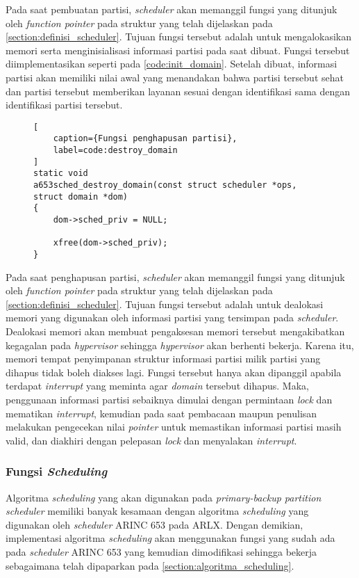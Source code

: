 Pada saat pembuatan partisi, \textit{scheduler} akan memanggil fungsi yang ditunjuk oleh
\textit{function pointer}  pada struktur yang telah dijelaskan pada
\autoref{section:definisi_scheduler}. Tujuan fungsi tersebut adalah untuk mengalokasikan memori
serta menginisialisasi informasi partisi pada saat dibuat. Fungsi tersebut diimplementasikan
seperti pada \autoref{code:init_domain}. Setelah dibuat, informasi partisi akan memiliki nilai
awal yang menandakan bahwa partisi tersebut sehat dan partisi tersebut memberikan layanan sesuai
dengan identifikasi sama dengan identifikasi partisi tersebut.


\begin{figure}
\begin{lstlisting}[
	caption={Fungsi penghapusan partisi},
	label=code:destroy_domain
]
static void
a653sched_destroy_domain(const struct scheduler *ops, struct domain *dom)
{
    dom->sched_priv = NULL;

    xfree(dom->sched_priv);
}
\end{lstlisting}
\end{figure}

Pada saat penghapusan partisi, \textit{scheduler} akan memanggil fungsi yang ditunjuk oleh
\textit{function pointer}  pada struktur yang telah dijelaskan pada
\autoref{section:definisi_scheduler}. Tujuan fungsi tersebut adalah untuk dealokasi memori yang
digunakan oleh informasi partisi yang tersimpan pada \textit{scheduler}. Dealokasi memori akan
membuat pengaksesan memori tersebut mengakibatkan kegagalan pada \textit{hypervisor} sehingga
\textit{hypervisor} akan berhenti bekerja. Karena itu, memori tempat penyimpanan struktur
informasi partisi milik partisi yang dihapus tidak boleh diakses lagi. Fungsi tersebut hanya
akan dipanggil apabila terdapat \textit{interrupt} yang meminta agar \textit{domain} tersebut
dihapus. Maka, penggunaan informasi partisi sebaiknya dimulai dengan permintaan \textit{lock}
dan mematikan \textit{interrupt}, kemudian pada saat pembacaan maupun penulisan melakukan
pengecekan nilai \textit{pointer} untuk memastikan informasi partisi masih valid, dan diakhiri
dengan pelepasan \textit{lock} dan menyalakan \textit{interrupt}.

\subsubsection{Fungsi \textit{Scheduling}}
\label{section:scheduling_impl}

Algoritma \textit{scheduling} yang akan digunakan pada \textit{primary-backup partition
scheduler} memiliki banyak kesamaan dengan algoritma \textit{scheduling} yang digunakan oleh
\textit{scheduler} ARINC 653 pada ARLX. Dengan demikian, implementasi algoritma
\textit{scheduling} akan menggunakan fungsi yang sudah ada pada \textit{scheduler} ARINC 653
yang kemudian dimodifikasi sehingga bekerja sebagaimana telah dipaparkan pada
\autoref{section:algoritma_scheduling}.

